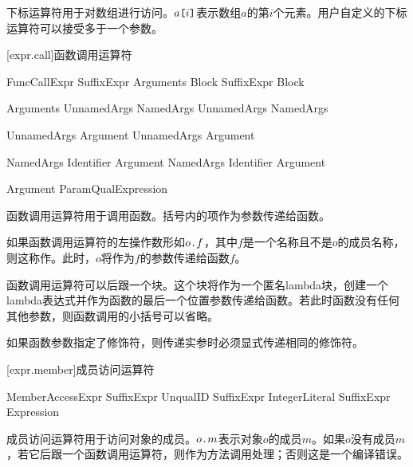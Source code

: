 \pnum
下标运算符用于对数组进行访问。$a\texttt{[}i\texttt{]}$表示数组$a$的第$i$个元素。用户自定义的下标运算符可以接受多于一个参数。

[expr.call]{函数调用运算符}

\begin{bnf}{FuncCallExpr}
    SuffixExpr \terminal{(} Arguments\bnfq \terminal{)} Block\bnfs \br
    SuffixExpr Block
\end{bnf}

\begin{bnf}{Arguments}
    UnnamedArgs \br
    NamedArgs \br
    UnnamedArgs \terminal{,} NamedArgs
\end{bnf}

\begin{bnf}{UnnamedArgs}
    Argument \br
    UnnamedArgs \terminal{,} Argument
\end{bnf}

\begin{bnf}{NamedArgs}
    Identifier \terminal{:} Argument \br
    NamedArgs \terminal{,} Identifier \terminal{:} Argument
\end{bnf}

\begin{bnf}{Argument}
    ParamQual\bnfq Expression
\end{bnf}

\pnum
函数调用运算符用于调用函数。括号内的项作为参数传递给函数。

\pnum
如果函数调用运算符的左操作数形如$o\texttt{.}f$，其中$f$是一个名称且不是$o$的成员名称，则这称作。此时，$o$将作为$f$的参数传递给函数$f$。

\pnum
函数调用运算符可以后跟一个块。这个块将作为一个匿名lambda块，创建一个lambda表达式并作为函数的最后一个位置参数传递给函数。若此时函数没有任何其他参数，则函数调用的小括号可以省略。

\pnum
如果函数参数指定了修饰符，则传递实参时必须显式传递相同的修饰符。

[expr.member]{成员访问运算符}

\begin{bnf}{MemberAccessExpr}
    SuffixExpr  UnqualID \br
    SuffixExpr  IntegerLiteral \br
    SuffixExpr  \terminal{(} Expression \terminal{)}
\end{bnf}

\pnum
成员访问运算符用于访问对象的成员。$o\texttt{.}m$表示对象$o$的成员$m$。如果$o$没有成员$m$，若它后跟一个函数调用运算符，则作为方法调用处理；否则这是一个编译错误。

